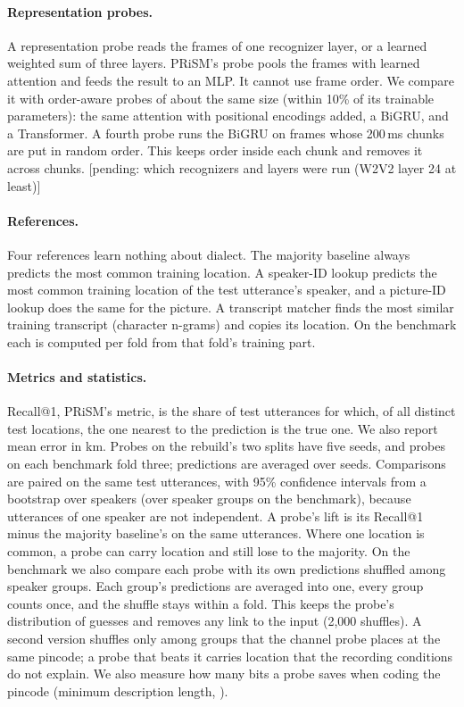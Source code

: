 \documentclass[11pt]{article}
\newcommand{\pending}[1]{{\color{red}[pending: #1]}}
\begin{document}
\paragraph{Representation probes.} A representation probe reads the frames of one recognizer layer, or a learned
weighted sum of three layers. PRiSM's probe pools the frames with learned attention and feeds the result to an
MLP. It cannot use frame order. We compare it with order-aware probes of about the same size (within 10\% of its
trainable parameters): the same attention with positional encodings added, a BiGRU, and a Transformer. A fourth
probe runs the BiGRU on frames whose 200\,ms chunks are put in random order. This keeps order inside each chunk and
removes it across chunks. \pending{which recognizers and layers were run (W2V2 layer 24 at least)}

\paragraph{References.} Four references learn nothing about dialect. The majority baseline always predicts the
most common training location. A speaker-ID lookup predicts the most common training location of the test
utterance's speaker, and a picture-ID lookup does the same for the picture. A transcript matcher finds the most
similar training transcript (character n-grams) and copies its location. On the benchmark each is computed per
fold from that fold's training part.

\paragraph{Metrics and statistics.} Recall@1, PRiSM's metric, is the share of test utterances for which, of all
distinct test locations, the one nearest to the prediction is the true one. We also report mean error in km.
Probes on the rebuild's two splits have five seeds, and probes on each benchmark fold three; predictions are
averaged over seeds. Comparisons are paired on the same test utterances, with 95\% confidence intervals from a
bootstrap over speakers (over speaker groups on the benchmark), because utterances of one speaker are not
independent. A probe's lift is its Recall@1 minus the majority baseline's on the same utterances. Where one location is
common, a probe can carry location and still lose to the majority. On the benchmark we also compare each probe
with its own predictions shuffled among speaker groups. Each group's predictions are averaged into one, every group
counts once, and the shuffle stays within a fold. This keeps the probe's distribution of guesses and removes any
link to the input (2,000 shuffles). A second version shuffles only among groups that the channel probe places at
the same pincode; a probe that beats it carries location that the recording conditions do not explain. We also
measure how many bits a probe saves when coding the pincode (minimum description length, \citealp{voita2020mdl}).
\end{document}

